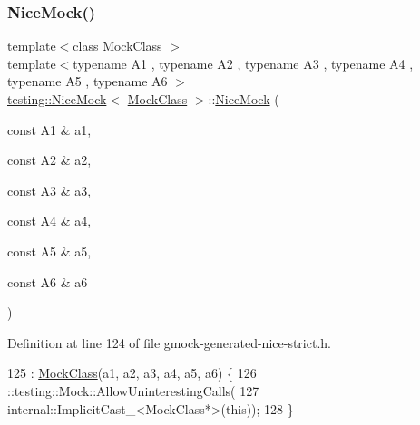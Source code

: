 \subsubsection{\texorpdfstring{Nice\+Mock()}{NiceMock()}\hspace{0.1cm}{\footnotesize\ttfamily [7/11]}}
{\footnotesize\ttfamily template$<$class Mock\+Class $>$ \\
template$<$typename A1 , typename A2 , typename A3 , typename A4 , typename A5 , typename A6 $>$ \\
\hyperlink{classtesting_1_1NiceMock}{testing\+::\+Nice\+Mock}$<$ \hyperlink{classMockClass}{Mock\+Class} $>$\+::\hyperlink{classtesting_1_1NiceMock}{Nice\+Mock} (\begin{DoxyParamCaption}\item[{const A1 \&}]{a1,  }\item[{const A2 \&}]{a2,  }\item[{const A3 \&}]{a3,  }\item[{const A4 \&}]{a4,  }\item[{const A5 \&}]{a5,  }\item[{const A6 \&}]{a6 }\end{DoxyParamCaption})\hspace{0.3cm}{\ttfamily [inline]}}



Definition at line 124 of file gmock-\/generated-\/nice-\/strict.\+h.


\begin{DoxyCode}
125                                   : \hyperlink{classMockClass}{MockClass}(a1, a2, a3, a4, a5, a6) \{
126     ::testing::Mock::AllowUninterestingCalls(
127         internal::ImplicitCast\_<MockClass*>(\textcolor{keyword}{this}));
128   \}
\end{DoxyCode}
\mbox{\label{classtesting_1_1NiceMock_a946d75ece1fa3a066b7d9d6ab7828c55}} 
